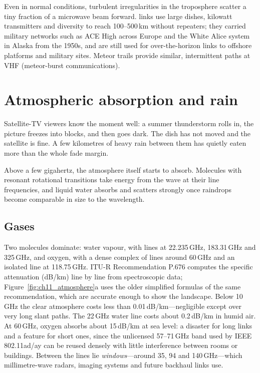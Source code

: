 Even in normal conditions, turbulent irregularities in the troposphere scatter a tiny fraction of
a microwave beam forward.  links use large dishes, kilowatt transmitters and
diversity to reach 100--500\,km without repeaters; they carried military networks such as ACE High
across Europe and the White Alice system in Alaska from the 1950s, and are still used for
over-the-horizon links to offshore platforms and military sites. Meteor trails provide
similar, intermittent paths at VHF (meteor-burst communications).

\section{Atmospheric absorption and rain}
\label{sec:ch11:atmos}

Satellite-TV viewers know the moment well: a summer thunderstorm rolls in, the picture freezes
into blocks, and then goes dark. The dish has not moved and the satellite is fine. A few
kilometres of heavy rain between them has quietly eaten more than the whole fade margin.

Above a few gigahertz, the atmosphere itself starts to absorb. Molecules with resonant
rotational transitions take energy from the wave at their line frequencies, and liquid water
absorbs and scatters strongly once raindrops become comparable in size to the wavelength.


\subsection{Gases}

Two molecules dominate: water vapour, with lines at 22.235\,GHz, 183.31\,GHz and 325\,GHz, and
oxygen, with a dense complex of lines around 60\,GHz and an isolated line at 118.75\,GHz. ITU-R
Recommendation P.676 computes the specific attenuation (dB/km) line by line from spectroscopic
data; Figure~\ref{fig:ch11_atmosphere}a uses the older simplified formulas of the same
recommendation, which are accurate enough to show the landscape. Below 10\,GHz the clear
atmosphere costs less than 0.01\,dB/km---negligible except over very long slant paths. The
22\,GHz water line costs about 0.2\,dB/km in humid air. At 60\,GHz, oxygen absorbs about 15\,dB/km
at sea level: a disaster for long links and a feature for short ones, since the unlicensed
57--71\,GHz band used by IEEE 802.11ad/ay can be reused densely with little interference between
rooms or buildings. Between the lines lie \emph{windows}---around 35, 94 and 140\,GHz---which
millimetre-wave radars, imaging systems and future backhaul links use.



